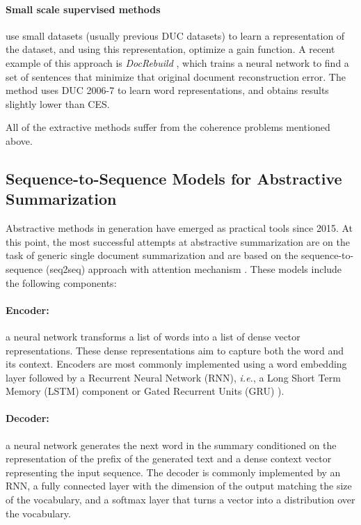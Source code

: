 \documentclass[11pt,a4paper]{article}
\begin{document}
\paragraph*{Small scale supervised methods} use small datasets (usually previous DUC datasets) to learn a representation of the dataset, and using this representation, optimize a gain function. A recent example of this approach is  \emph{DocRebuild} \cite{ma2016unsupervised}, which trains a neural network to find a set of sentences that minimize that original document reconstruction error. The method uses DUC 2006-7 to learn word representations, and obtains results slightly lower than CES.

All of the extractive methods suffer from the coherence problems mentioned above.

\subsection{Sequence-to-Sequence Models for Abstractive Summarization}

Abstractive methods in generation have emerged as practical tools since 2015.  At this point, the most successful attempts at abstractive summarization are on the task of generic single document summarization \cite{rush2015neural,nallapati2016abstractive,DBLP:journals/corr/SeeLM17,DBLP:journals/corr/PaulusXS17} and are based on the sequence-to-sequence (seq2seq) approach with attention mechanism \cite{DBLP:journals/corr/BahdanauCB14}. These models include the following components:

\paragraph{Encoder:} a neural network transforms a list of words into a list of dense vector representations. These dense representations aim to capture both the word and its context. Encoders are most commonly implemented using a word embedding layer followed by a Recurrent Neural Network (RNN), \emph{i.e.}, a Long Short Term Memory (LSTM) component \cite{hochreiter1997long} or Gated Recurrent Units (GRU) \cite{chung2014empirical}).

\paragraph{Decoder:} a neural network generates the next word in the summary conditioned on the representation of the prefix of the generated text and a dense context vector representing the input sequence.  The decoder is commonly implemented by an RNN, a fully connected layer with the dimension of the output matching the size of the vocabulary, and a softmax layer that turns a vector into a distribution over the vocabulary.
\end{document}
